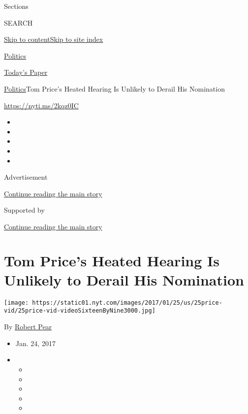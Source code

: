Sections

SEARCH

\protect\hyperlink{site-content}{Skip to
content}\protect\hyperlink{site-index}{Skip to site index}

\href{https://www.nytimes.com/section/politics}{Politics}

\href{https://myaccount.nytimes.com/auth/login?response_type=cookie\&client_id=vi}{}

\href{https://www.nytimes.com/section/todayspaper}{Today's Paper}

\href{/section/politics}{Politics}\textbar{}Tom Price's Heated Hearing
Is Unlikely to Derail His Nomination

\url{https://nyti.ms/2kqz0IC}

\begin{itemize}
\item
\item
\item
\item
\item
\end{itemize}

Advertisement

\protect\hyperlink{after-top}{Continue reading the main story}

Supported by

\protect\hyperlink{after-sponsor}{Continue reading the main story}

\hypertarget{tom-prices-heated-hearing-is-unlikely-to-derail-his-nomination}{%
\section{Tom Price's Heated Hearing Is Unlikely to Derail His
Nomination}\label{tom-prices-heated-hearing-is-unlikely-to-derail-his-nomination}}

\texttt{[image: https://static01.nyt.com/images/2017/01/25/us/25price-vid/25price-vid-videoSixteenByNine3000.jpg]}

By \href{https://www.nytimes.com/by/robert-pear}{Robert Pear}

\begin{itemize}
\item
  Jan. 24, 2017
\item
  \begin{itemize}
  \item
  \item
  \item
  \item
  \item
  \end{itemize}
\end{itemize}

